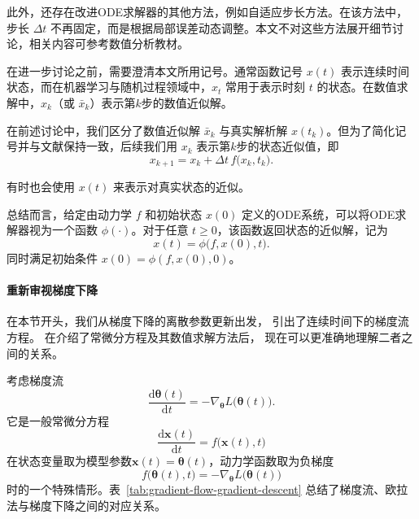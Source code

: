 此外，还存在改进ODE求解器的其他方法，例如自适应步长方法。在该方法中，步长 $\Delta t$ 不再固定，而是根据局部误差动态调整。本文不对这些方法展开细节讨论，相关内容可参考数值分析教材。

在进一步讨论之前，需要澄清本文所用记号。通常函数记号 $x(t)$ 表示连续时间状态，而在机器学习与随机过程领域中，$x_t$ 常用于表示时刻 $t$ 的状态。在数值求解中，$x_k$（或 $\bar{x}_k$）表示第$k$步的数值近似解。

在前述讨论中，我们区分了数值近似解 $\bar{x}_k$ 与真实解析解 $x(t_k)$。但为了简化记号并与文献保持一致，后续我们用 $x_k$ 表示第$k$步的状态近似值，即
\begin{equation}
x_{k+1}
=
x_k
+
\Delta t\,
f\bigl(x_k,t_k\bigr).
\label{eq:euler-method-simplified}
\end{equation}

有时也会使用 $x(t)$ 来表示对真实状态的近似。

总结而言，给定由动力学 $f$ 和初始状态 $x(0)$ 定义的ODE系统，可以将ODE求解器视为一个函数 $\phi(\cdot)$。对于任意 $t\ge 0$，该函数返回状态的近似解，记为
\begin{equation}
x(t)
=
\phi\bigl(f,x(0),t\bigr).
\label{eq:ode-solution-operator}
\end{equation}
同时满足初始条件 $x(0)=\phi(f,x(0),0)$。


\paragraph{重新审视梯度下降}

在本节开头，我们从梯度下降的离散参数更新出发，
引出了连续时间下的梯度流方程。
在介绍了常微分方程及其数值求解方法后，
现在可以更准确地理解二者之间的关系。

考虑梯度流
\begin{equation}
    \frac{\mathrm{d}\boldsymbol{\theta}(t)}
    {\mathrm{d}t}
    =
    -
    \nabla_{\boldsymbol{\theta}}
    L\bigl(\boldsymbol{\theta}(t)\bigr).
    \label{eq:gradient-flow-revisited}
\end{equation}
它是一般常微分方程\[
    \frac{\mathrm{d}\boldsymbol{x}(t)}{\mathrm{d}t}
    =
    f\bigl(\boldsymbol{x}(t),t\bigr)
\]在状态变量取为模型参数\(\boldsymbol{x}(t)=\boldsymbol{\theta}(t)\)，动力学函数取为负梯度
\[
    f\bigl(\boldsymbol{\theta}(t),t\bigr)
    =
    -
    \nabla_{\boldsymbol{\theta}}
    L\bigl(\boldsymbol{\theta}(t)\bigr)
\]
时的一个特殊情形。表~\ref{tab:gradient-flow-gradient-descent}
总结了梯度流、欧拉法与梯度下降之间的对应关系。

